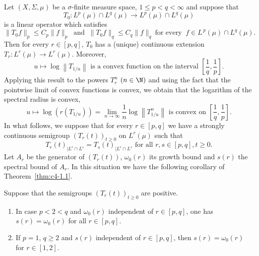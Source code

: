 Let $(X,\Sigma,\mu)$ be a $\sigma$-finite measure space, $1 \leq p < q < \infty$ and suppose that 
\[
T_{0} \colon L^{p}(\mu) \cap L^{q}(\mu) \to L^{p}(\mu) \cap L^{q}(\mu)
\]
is a linear operator which satisfies 
\[
\|T_{0}f\|_{p} \leq C_{p}\|f\|_{p} \ \text{ and } \ \|T_{0}f\|_{q} \leq C_{q}\|f\|_{q} 
\ \text{for every } \ f\in L^{\,p}(\mu) \cap L^{q}(\mu) .
\]
Then for every $r \in [p,q]$, $T_{0}$ has a (unique) continuous extension $T_{r} \colon L^{r}(\mu) \to L^{r}(\mu)$.
Moreover,
\begin{equation}\label{eq:c4-1.1}
u \mapsto \log\left\|T_{1/u}\right\| \text{ is a convex function on the interval } \left[\frac{1}{q},\frac{1}{p}\right].
\end{equation}
Applying this result to the powers $T_{r}^{n}$ $(n \in\N)$ and using the fact that the pointwise limit of convex functions is convex, we obtain that the logarithm of the spectral radius is convex, \ie
\begin{equation}\label{eq:c4-1.2}
u \mapsto \log(r(T_{1/u})) = \lim_{n\to\infty} \frac{1}{n}\log\left\|T_{1/u}^{n}\right\| \text{ is convex on }  \left[\frac{1}{q},\frac{1}{p}\right].
\end{equation}
In what follows, we suppose that for every $r \in [p,q]$ we have a strongly continuous semigroup $(T_{r}(t))_{t\geq 0}$ on $L^{r}(\mu)$ such that
\begin{equation}\label{eq:c4-1.3}
T_{r}(t)_{|L^{r} \cap L^{s}} = T_{s}(t)_{|L^{r} \cap L^{s}} \text{ for all } r,s \in [p,q], t \geq 0.
\end{equation}
Let $A_{r}$ be the generator of\/ $(T_{r}(t))$, $\omega_{0}(r)$ its growth bound and $s(r)$ the spectral bound of\/ $A_{r}$.
In this situation we have the following corollary of Theorem~\ref{thm:c4-1.1}.
\begin{corollary}\label{cor:c4-1.2}
Suppose that the semigroups $(T_{r}(t))_{t\geq 0}$ are positive.
\begin{enumerate}[\upshape(i)]
\item \label{cor:c4-1.2-1}
In case $p < 2 < q$ and $\omega_{0}(r)$ independent of\/ $r \in [p,q]$, one has $s(r) = \omega_{0}(r)$ for all $r \in [p,q]$.
\item \label{cor:c4-1.2-2}
If\/ $p = 1$, $q \geq 2$ and $s(r)$ independent of\/ $r \in [p,q]$, then $s(r) = \omega_{0}(r)$ for $r \in [1,2]$.
\end{enumerate}
\end{corollary}

